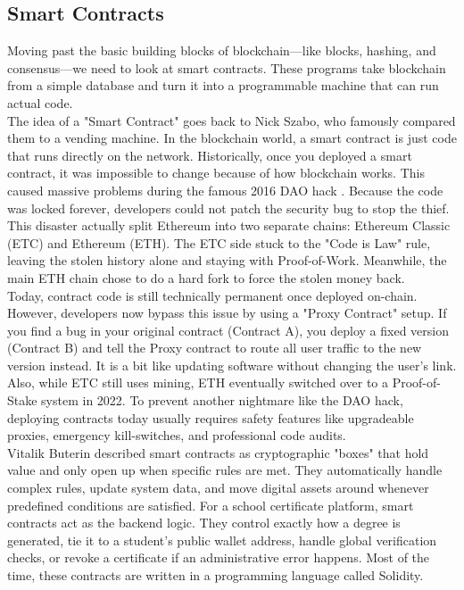 \subsection{Smart Contracts}

Moving past the basic building blocks of blockchain—like blocks, hashing, and consensus—we need to look at smart contracts. These programs take blockchain from a simple database and turn it into a programmable machine that can run actual code.\\

The idea of a "Smart Contract" goes back to Nick Szabo, who famously compared them to a vending machine\cite{szabo1997smartcontracts}. In the blockchain world, a smart contract is just code that runs directly on the network. Historically, once you deployed a smart contract, it was impossible to change because of how blockchain works. This caused massive problems during the famous 2016 DAO hack \cite{daoattack2017}. Because the code was locked forever, developers could not patch the security bug to stop the thief. This disaster actually split Ethereum into two separate chains: Ethereum Classic (ETC) and Ethereum (ETH). The ETC side stuck to the "Code is Law" rule, leaving the stolen history alone and staying with Proof-of-Work. Meanwhile, the main ETH chain chose to do a hard fork to force the stolen money back.\\

Today, contract code is still technically permanent once deployed on-chain. However, developers now bypass this issue by using a "Proxy Contract" setup. If you find a bug in your original contract (Contract A), you deploy a fixed version (Contract B) and tell the Proxy contract to route all user traffic to the new version instead. It is a bit like updating software without changing the user's link. Also, while ETC still uses mining, ETH eventually switched over to a Proof-of-Stake system in 2022. To prevent another nightmare like the DAO hack, deploying contracts today usually requires safety features like upgradeable proxies, emergency kill-switches, and professional code audits.\\

Vitalik Buterin described smart contracts as cryptographic "boxes" that hold value and only open up when specific rules are met\cite{buterin2014ethereum}. They automatically handle complex rules, update system data, and move digital assets around whenever predefined conditions are satisfied\cite{yaga2018blockchain}. For a school certificate platform, smart contracts act as the backend logic. They control exactly how a degree is generated, tie it to a student's public wallet address, handle global verification checks, or revoke a certificate if an administrative error happens. Most of the time, these contracts are written in a programming language called Solidity\cite{perez2020smartcontracts}.